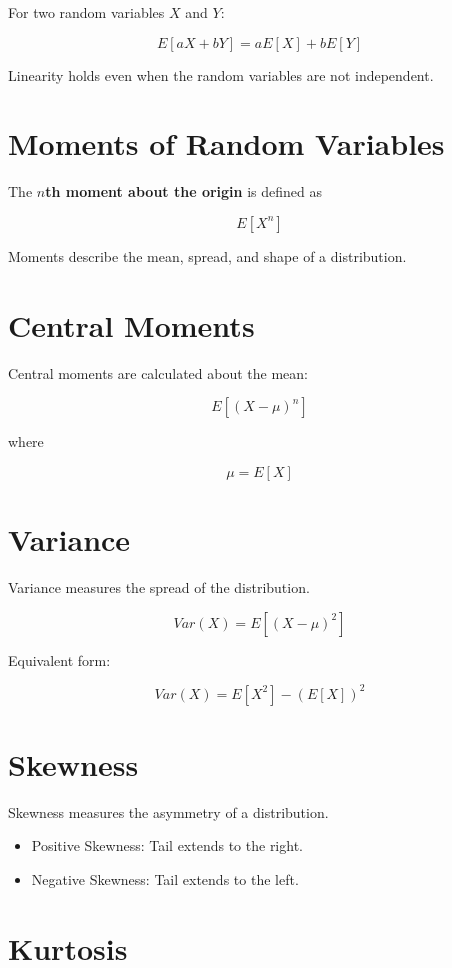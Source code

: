 \documentclass[12pt]{article}
\begin{document}
For two random variables $X$ and $Y$:

\[
E[aX + bY] = aE[X] + bE[Y]
\]

Linearity holds even when the random variables are not independent.

\section{Moments of Random Variables}

The \textbf{$n$th moment about the origin} is defined as

\[
E[X^n]
\]

Moments describe the mean, spread, and shape of a distribution.

\section{Central Moments}

Central moments are calculated about the mean:

\[
E[(X-\mu)^n]
\]

where

\[
\mu = E[X]
\]

\section{Variance}

Variance measures the spread of the distribution.

\[
Var(X) = E[(X-\mu)^2]
\]

Equivalent form:

\[
Var(X) = E[X^2] - (E[X])^2
\]

\section{Skewness}

Skewness measures the asymmetry of a distribution.

\begin{itemize}
\item Positive Skewness: Tail extends to the right.
\item Negative Skewness: Tail extends to the left.
\end{itemize}

\section{Kurtosis}
\end{document}
